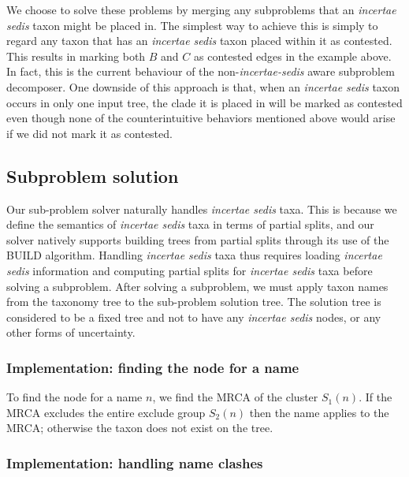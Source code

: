 \documentclass[english]{article}
\begin{document}
We choose to solve these problems by merging any subproblems that an
\emph{incertae sedis} taxon might be placed in.
The simplest way to
achieve this is simply to regard any taxon that has an \emph{incertae
sedis }taxon placed within it as contested.
This results in marking
both $B$ and $C$ as contested edges in the example above.
In fact,
this is the current behaviour of the non-\emph{incertae-sedis} aware
subproblem decomposer.
One downside of this approach is that, when an \emph{incertae sedis} taxon
    occurs in only one input tree, the clade it is placed in will be
    marked as contested even though none of the counterintuitive
    behaviors mentioned above would arise if we did not
    mark it as contested.



\subsection{Subproblem solution}

Our sub-problem solver naturally handles \emph{incertae sedis} taxa.
This is because we define the semantics of \emph{incertae sedis} taxa
in terms of partial splits, and our solver natively supports building
trees from partial splits through its use of the BUILD algorithm.
Handling \emph{incertae sedis} taxa thus requires loading \emph{incertae
sedis} information and computing partial splits for \emph{incertae
sedis} taxa before solving a subproblem.
After solving a subproblem,
we must apply taxon names from the taxonomy tree to the sub-problem
solution tree.
The solution tree is considered to be a fixed tree and not
to have any \emph{incertae sedis} nodes, or any other forms of
uncertainty.


\subsubsection{Implementation: finding the node for a name}

To find the node for a name $n$, we find the MRCA of the cluster
$S_{1}(n)$.
If the MRCA excludes the entire exclude group $S_{2}(n)$
then the name applies to the MRCA; otherwise the taxon does not exist
on the tree.

\subsubsection{Implementation: handling name clashes}
\end{document}
